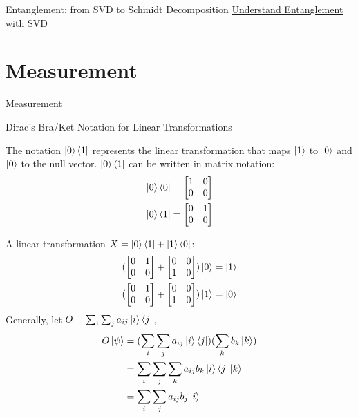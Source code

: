 \documentclass{beamer}
\begin{document}
\begin{frame}{Entanglement: from SVD to Schmidt Decomposition\tiny\cite{understandingentanglementwithsvd}}
  \href{https://www.math3ma.com/blog/understanding-entanglement-with-svd}{Understand Entanglement with SVD}
\end{frame}

\section{Measurement}
\begin{frame}
  Measurement
\end{frame}


\begin{frame}{Dirac's Bra/Ket Notation for Linear Transformations}
  {\tiny
  The notation $\ket{0}\bra{1}$ represents the linear transformation that maps $\ket{1}$ to $\ket{0}$ and $\ket{0}$ to the null vector.
  $\ket{0}\bra{1}$ can be written in matrix notation:
    \begin{align*}
      \ket{0}\bra{0} &= \begin{bmatrix}
                        1 & 0 \\
                        0 & 0
                        \end{bmatrix} \\
      \ket{0}\bra{1} &= \begin{bmatrix}
                        0 & 1 \\
                        0 & 0
                        \end{bmatrix}
    \end{align*}

  A linear transformation $X=\ket{0}\bra{1} + \ket{1}\bra{0}$:
    \begin{align*}
      (\begin{bmatrix}
       0 & 1 \\
       0 & 0
       \end{bmatrix}
       + 
       \begin{bmatrix}
       0 & 0 \\
       1 & 0
       \end{bmatrix}) \ket{0} = \ket{1} \\
      (\begin{bmatrix}
       0 & 1 \\
       0 & 0
       \end{bmatrix}
       + 
       \begin{bmatrix}
       0 & 0 \\
       1 & 0
       \end{bmatrix}) \ket{1} = \ket{0}
    \end{align*}
  Generally, let $O = \sum_{i}\sum_{j}a_{ij}\ket{i}\bra{j}$,
    \begin{align*}
      O\ket{\psi} &= (\sum_{i}\sum_{j}a_{ij}\ket{i}\bra{j}) (\sum_{k}b_{k}\ket{k}) \\
                  &= \sum_{i}\sum_{j}\sum_{k} a_{ij}b_{k}\ket{i}\bra{j}\ket{k} \\
                  &= \sum_{i}\sum_{j}a_{ij}b_{j}\ket{i}
    \end{align*}
  }%
\end{frame}
\end{document}
